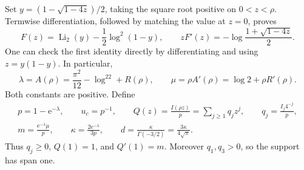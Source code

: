 \documentclass[11pt]{article}
\theoremstyle{remark}\newtheorem{remark}[theorem]{Remark}
\theoremstyle{definition}\newtheorem{definition}[theorem]{Definition}
\newcommand{\e}{\mathrm e}
\DeclareMathOperator{\Li}{Li}
\begin{document}
Set $y=(1-\sqrt{1-4z})/2$, taking the square root positive on $0<z<\rho$. Termwise differentiation, followed by matching the value at $z=0$, proves
\begin{equation}\label{tss:sc:eq:F}
 F(z)=\Li_2(y)-\frac12\log^2(1-y),\qquad
 zF'(z)=-\log\frac{1+\sqrt{1-4z}}2.
\end{equation}
One can check the first identity directly by differentiating and using $z=y(1-y)$. In particular,
\begin{equation}\label{tss:sc:eq:lammu}
 \lambda=A(\rho)=\frac{\pi^2}{12}-\log^22+R(\rho),\qquad
 \mu=\rho A'(\rho)=\log2+\rho R'(\rho).
\end{equation}
Both constants are positive. Define
\begin{equation}\label{tss:sc:eq:constants}
 \begin{gathered}
 p=1-\e^{-\lambda},\qquad u_c=p^{-1},\qquad
 Q(z)=\frac{I(\rho z)}p=\sum_{j\geq1}q_jz^j,\qquad
 q_j=\frac{I_j4^{-j}}p,\\
 m=\frac{\e^{-\lambda}\mu}p,\qquad
 \kappa=\frac{2\e^{-\lambda}}{3p},\qquad
 d=\frac{\kappa}{\Gamma(-3/2)}=\frac{3\kappa}{4\sqrt\pi}.
 \end{gathered}
\end{equation}
Thus $q_j\geq0$, $Q(1)=1$, and $Q'(1)=m$. Moreover $q_1,q_3>0$, so the support has span one.
\end{document}

